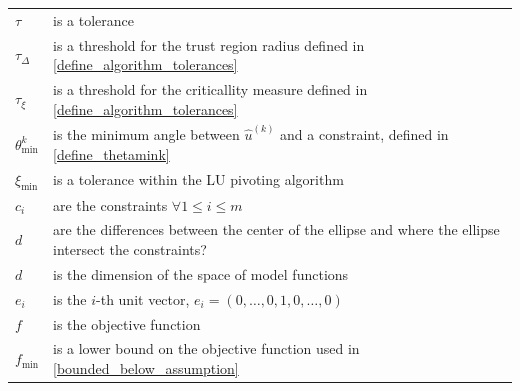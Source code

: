 \documentclass{article}
\theoremstyle{case}
\newcommand{\fmin}{f_{\text{min}}}
\newcommand{\huk}{{{\hat u}^{(k)}}}
\newcommand{\thetamink}{{\theta^k_{\text{min}}}}
\newcommand{\tolcrit}{\tau_{\xi}}
\newcommand{\tolrad}{\tau_{\Delta}}
\begin{document}
\begin{longtable}{| p{} | p{} |}
$\tau$ & is a tolerance \\ %
$\tolrad$ & is a threshold for the trust region radius defined in \cref{define_algorithm_tolerances} \\ %
$\tolcrit$ & is a threshold for the criticallity measure defined in \cref{define_algorithm_tolerances} \\ %
$\thetamink$ & is the minimum angle between $\huk$ and a constraint, defined in \cref{define_thetamink} \\ %
$\xi_{\text{min}}$ & is a tolerance within the LU pivoting algorithm \\ %
$c_i$ & are the constraints $\forall 1 \le i \le m$ \\ %
$d$ & are the differences between the center of the ellipse and where the ellipse intersect the constraints? \\ %
$d$ & is the dimension of the space of model functions \\ %
$e_i$ & is the $i$-th unit vector, $e_i = (0, \ldots, 0, 1, 0, \ldots, 0)$ \\ %
$f$ & is the objective function \\ %
$\fmin$ & is a lower bound on the objective function used in \cref{bounded_below_assumption}\\ %

\end{longtable}
\end{document}
